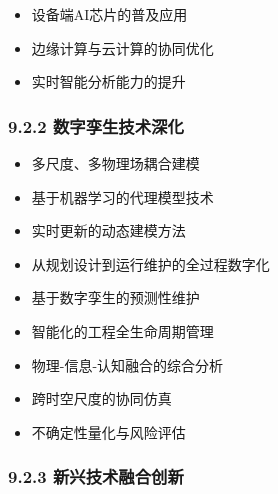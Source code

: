 
\begin{itemize}
\tightlist
\item
  设备端AI芯片的普及应用
\item
  边缘计算与云计算的协同优化
\item
  实时智能分析能力的提升
\end{itemize}

\hypertarget{ux6570ux5b57ux5b6aux751fux6280ux672fux6df1ux5316-1}{%
\subsubsection{9.2.2 数字孪生技术深化}\label{ux6570ux5b57ux5b6aux751fux6280ux672fux6df1ux5316-1}}


\begin{itemize}
\tightlist
\item
  多尺度、多物理场耦合建模
\item
  基于机器学习的代理模型技术
\item
  实时更新的动态建模方法
\end{itemize}


\begin{itemize}
\tightlist
\item
  从规划设计到运行维护的全过程数字化
\item
  基于数字孪生的预测性维护
\item
  智能化的工程全生命周期管理
\end{itemize}


\begin{itemize}
\tightlist
\item
  物理-信息-认知融合的综合分析
\item
  跨时空尺度的协同仿真
\item
  不确定性量化与风险评估
\end{itemize}

\hypertarget{ux65b0ux5174ux6280ux672fux878dux5408ux521bux65b0}{%
\subsubsection{9.2.3 新兴技术融合创新}\label{ux65b0ux5174ux6280ux672fux878dux5408ux521bux65b0}}


